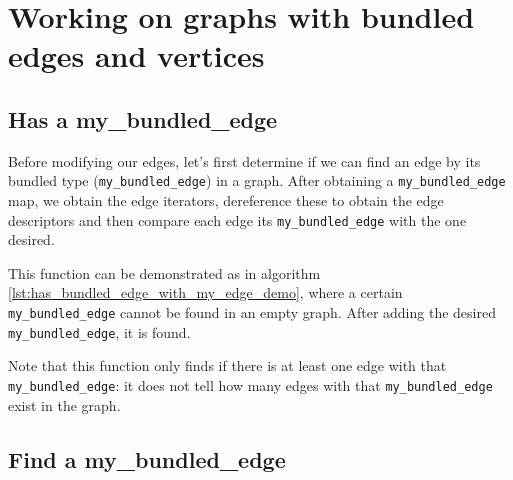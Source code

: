 \chapter{Working on graphs with bundled edges and vertices}

\section{Has a my\_bundled\_edge}
\label{subsec:has_bundled_edge_with_my_edge}

Before modifying our edges, let's first determine if we can find an edge
by its bundled type (\verb;my_bundled_edge;) in a graph.
After obtaining a \verb;my_bundled_edge; map, 
we obtain the edge iterators, dereference these to obtain 
the edge descriptors and then compare each edge its \verb;my_bundled_edge; 
with the one desired.



This function can be demonstrated as in algorithm 
\ref{lst:has_bundled_edge_with_my_edge_demo}, 
where a certain \verb;my_bundled_edge; cannot be found in an empty graph.
After adding the desired \verb;my_bundled_edge;, it is found.



Note that this function only finds if there is at least one edge with that
\verb;my_bundled_edge;: 
it does not tell how many edges with that \verb;my_bundled_edge;
exist in the graph.

\section{Find a my\_bundled\_edge}
\label{subsec:find_first_bundled_edge_with_my_edge}

